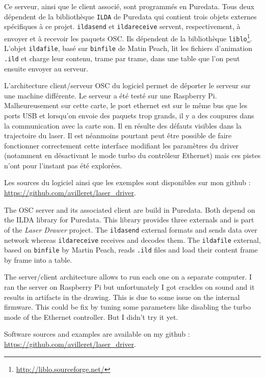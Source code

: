 \begin{fr}
Ce serveur, ainsi que le client associé, sont programmés en Puredata.
Tous deux dépendent de la bibliothèque \texttt{ILDA} de Puredata qui contient trois objets externes spécifiques à ce projet.
\texttt{ildasend} et \texttt{ildareceive} servent, respectivement, à envoyer et à recevoir les paquets OSC.
Ils dépendent de la bibliothèque \texttt{liblo}\footnote{\url{http://liblo.sourceforge.net/}}.
L'objet \texttt{ildafile}, basé sur \texttt{binfile} de Matin Peach, lit les fichiers d'animation \texttt{.ild} et charge leur contenu, trame par trame, dans une table que l'on peut ensuite envoyer au serveur.

L'architecture client/serveur OSC du logiciel permet de déporter le serveur sur une machine différente. 
Le serveur a été testé sur une Raspberry Pi. 
Malheureusement sur cette carte, le port ethernet est sur le même bus que les ports USB et lorsqu'on envoie des paquets trop grands, il y a des coupures dans la communication avec la carte son. 
Il en résulte des défauts visibles dans la trajectoire du laser.
Il est néanmoins pourtant peut être possible de faire fonctionner correctement cette interface modifiant les paramètres du driver (notamment en désactivant le mode turbo du contrôleur Ethernet) mais ces pistes n'ont pour l'instant pas été explorées.

Les sources du logiciel ainsi que les exemples sont disponibles sur mon github : \url{https://github.com/avilleret/laser_driver}.

\end{fr}

\begin{en}
The OSC server and its associated client are build in Puredata.
Both depend on the ILDA library for Puredata.
This library provides three externals and is part of the \textit{Laser Drawer} project.
The \texttt{ildasend} external formats and sends data over network whereas \texttt{ildareceive} receives and decodes them.
The \texttt{ildafile} external, based on \texttt{binfile} by Martin Peach, reads \texttt{.ild} files and load their content frame by frame into a table.

The server/client architecture allows to run each one on a separate computer.
I ran the server on Raspberry Pi but unfortunately I got crackles on sound and it results in artifacts in the drawing.
This is due to some issue on the internal firmware.
This could be fix by tuning some parameters like disabling the turbo mode of the Ethernet controller. 
But I didn't try it yet.

Software sources and examples are available on my github : \url{https://github.com/avilleret/laser_driver}.
\end{en}

